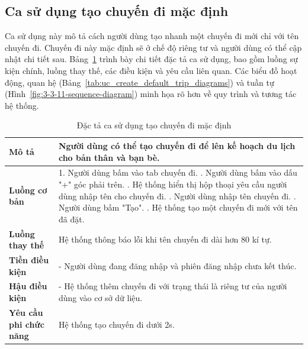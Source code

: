 \subsection{Ca sử dụng tạo chuyến đi mặc định}
\noindent Ca sử dụng này mô tả cách người dùng tạo nhanh một chuyến đi mới chỉ với tên chuyến đi. Chuyến đi này mặc định sẽ ở chế độ riêng tư và người dùng có thể cập nhật chi tiết sau. Bảng~\ref{tab:uc_create_default_trip_spec} trình bày chi tiết đặc tả ca sử dụng, bao gồm luồng sự kiện chính, luồng thay thế, các điều kiện và yêu cầu liên quan. Các biểu đồ hoạt động, quan hệ (Bảng~\ref{tab:uc_create_default_trip_diagrams}) và tuần tự (Hình~\ref{fig:3-3-11-sequence-diagram}) minh họa rõ hơn về quy trình và tương tác hệ thống.

\begin{longtable}{| p{4cm} | p{\dimexpr\linewidth-4cm-4\tabcolsep} |} %
    \caption{Đặc tả ca sử dụng tạo chuyến đi mặc định} %
    \label{tab:uc_create_default_trip_spec} \\ %

    \hline
    \textbf{Mô tả} & Người dùng có thể tạo chuyến đi để lên kế hoạch du lịch cho bản thân và bạn bè. \\
    \hline
    \endfirsthead %



    \hline %
    \endlastfoot

    \textbf{Luồng cơ bản} & 1. Người dùng bấm vào tab chuyến đi. \newline
                           2. Người dùng bấm vào dấu "+" góc phải trên. \newline
                           3. Hệ thống hiển thị hộp thoại yêu cầu người dùng nhập tên cho chuyến đi. \newline
                           4. Người dùng nhập tên chuyến đi. \newline
                           5. Người dùng bấm "Tạo". \newline
                           6. Hệ thống tạo một chuyến đi mới với tên đã đặt. \\
    \hline
    \textbf{Luồng thay thế} & Hệ thống thông báo lỗi khi tên chuyến đi dài hơn 80 kí tự. \\
    \hline
    \textbf{Tiền điều kiện} & - Người dùng đang đăng nhập và phiên đăng nhập chưa kết thúc. \\
    \hline
    \textbf{Hậu điều kiện} & - Hệ thống thêm chuyến đi với trạng thái là riêng tư của người dùng vào cơ sở dữ liệu. \\
    \hline
    \textbf{Yêu cầu phi chức năng} & Hệ thống tạo chuyến đi dưới 2s. \\

\end{longtable}


